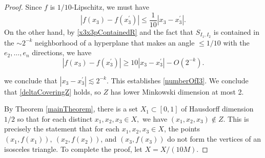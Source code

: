 \begin{proof}
Since $f$ is $1/10$-Lipschitz, we must have 
$$
|f(x_3)-f(x_3^\prime)|\leq \frac{1}{10}|x_3-x_3^\prime|.
$$
On the other hand, by \eqref{x3x3pContainedR} and the fact that $S_{I_1,I_2}$ is contained in the $\sim 2^{-k}$ neighborhood of a hyperplane that makes an angle $\leq 1/10$ with the $e_2,\ldots,e_n$ directions, we have
$$
|f(x_3)-f(x_3^\prime)|\geq 10|x_3-x_3^\prime|-O(2^{-k}).
$$ 


we conclude that $|x_3-x_3^\prime|\lesssim 2^{-k}$. This establishes \eqref{numberOfI3}. We conclude that \eqref{deltaCoveringZ} holds, so $Z$ has lower Minkowski dimension at most 2. 

By Theorem \ref{mainTheorem}, there is a set $X_1\subset[0,1]$ of Hausdorff dimension $1/2$ so that for each distinct $x_1,x_2,x_3\in X,$ we have $(x_1,x_2,x_3)\not\in Z$. This is precisely the statement that for each $x_1,x_2,x_3\in X$, the points $(x_1,f(x_1)),\ (x_2,f(x_2))$, and $(x_3,f(x_3))$ do not form the vertices of an isosceles triangle. To complete the proof, let $X = X/(10M)$.
\end{proof}




